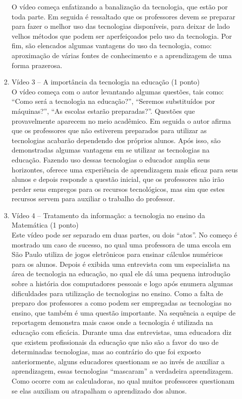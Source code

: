 \documentclass[a4paper, 12pt]{article}
\begin{document}
\begin{enumerate}
\begin{enumerate}
    O vídeo começa enfatizando a banalização da tecnologia, que estão por toda parte. Em seguida é ressaltado que os professores devem se preparar para fazer o melhor uso das tecnologias disponíveis, para deixar de lado velhos métodos que podem ser aperfeiçoados pelo uso da tecnologia.
    Por fim, são elencados algumas vantagens do uso da tecnologia, como: aproximação de várias fontes de conhecimento e a aprendizagem de uma forma prazerosa. \\
  \item Vídeo 3 – A importância da tecnologia na educação (1 ponto) \\ 
    O vídeo começa com o autor levantando algumas questões, tais como: ``Como será a tecnologia na educação?'', ``Seremos substituídos por máquinas?'', ``As escolas estarão preparadas?''. Questões que provavelmente aparecem no meio acadêmico. Em seguida o autor afirma que os professores que não estiverem preparados para utilizar as tecnologias acabarão dependendo dos próprios alunos. Após isso, são demonstradas algumas vantagens em se utilizar as tecnologias na educação. Fazendo uso dessas tecnologias o educador amplia seus horizontes, oferece uma experiência de aprendizagem mais eficaz para seus alunos e depois responde a questão inicial, que os professores não irão perder seus empregos para os recursos tecnológicos, mas sim que estes recursos servem para auxiliar o trabalho do professor.
  \item Vídeo 4 – Tratamento da informação: a tecnologia no ensino da Matemática (1 ponto) \\ 
    Este vídeo pode ser separado em duas partes, ou dois ``atos''. No começo é mostrado um caso de sucesso, no qual uma professora de uma escola em São Paulo utiliza de jogos eletrônicos para ensinar cálculos numéricos para os alunos. Depois é exibida uma entrevista com um especialista na área de tecnologia na educação, no qual ele dá uma pequena introdução sobre a história dos computadores pessoais e logo após enumera algumas dificuldades para utilização de tecnologias no ensino. Como a falta de preparo dos professores a como podem ser empregadas as tecnologias no ensino, que também é uma questão importante.
    Na sequência a equipe de reportagem demonstra mais casos onde a tecnologia é utilizada na educação com eficácia. Durante uma das entrevistas, uma educadora diz que existem profissionais da educação que não são a favor do uso de determinadas tecnologias, mas ao contrário do que foi exposto anteriormente, alguns educadores questionam se ao invés de auxiliar a aprendizagem, essas tecnologias ``mascaram'' a verdadeira aprendizagem.  Como ocorre com as calculadoras, no qual muitos professores questionam se elas auxiliam ou atrapalham o aprendizado dos alunos.

\end{enumerate}
\end{enumerate}
\end{document}
